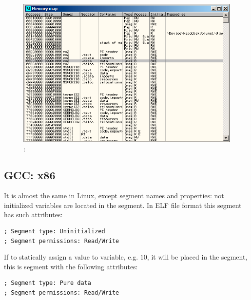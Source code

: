 \begin{figure}[H]
\centering
\includegraphics[scale=0.66]{patterns/04_scanf/ex2_olly_2.png}
\caption{\olly: }
\label{fig:scanf_ex2_olly_2}
\end{figure}

\subsection{GCC: x86}

{It is almost the same in Linux, except segment names and properties: 
not initialized variables are located in the  segment. 
In \ac{ELF} file format this segment has such attributes:}

\begin{lstlisting}
; Segment type: Uninitialized
; Segment permissions: Read/Write
\end{lstlisting}

{If to statically assign a value to variable, e.g. $10$, it will be placed in the  segment, 
this is segment with the following attributes:}

\begin{lstlisting}
; Segment type: Pure data
; Segment permissions: Read/Write
\end{lstlisting}

